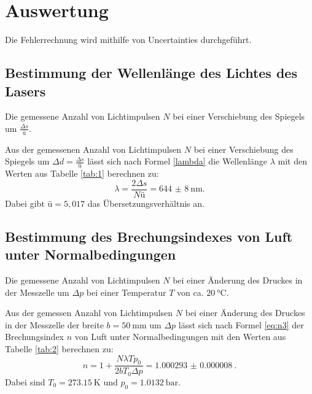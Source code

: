 \section{Auswertung}
\label{sec:Auswertung}

Die Fehlerrechnung wird mithilfe von Uncertainties \cite{uncertainties} durchgeführt.

\subsection{Bestimmung der Wellenlänge des Lichtes des Lasers}
\begin{table}
	\centering
	\caption{Die gemessene Anzahl von Lichtimpulsen $N$ bei einer Verschiebung des Spiegels um $\frac{\Delta s}{ü}$.}
	
	\label{tab:1}
\end{table}
\noindent Aus der gemessenen Anzahl von Lichtimpulsen $N$ bei einer Verschiebung des Spiegels um $\Delta d=\frac{\Delta s}{ü}$ lässt sich nach Formel \eqref{lambda} die Wellenlänge $\lambda$ mit den Werten aus Tabelle \ref{tab:1} berechnen zu:
\[
	\lambda = \frac{2\Delta s}{N ü}=\SI{644(8)}{\nano\meter}\text{.}
\]
Dabei gibt $ü=5,017$ das Übersetzungsverhältnis an.

\subsection{Bestimmung des Brechungsindexes von Luft unter Normalbedingungen}
\begin{table}
	\centering
	\caption{Die gemessene Anzahl von Lichtimpulsen $N$ bei einer Änderung des Druckes in der Messzelle um $\Delta p$ bei einer Temperatur $T$ von ca. $\SI{20}{\degreeCelsius}$.}
	
	\label{tab:2}
\end{table}
\noindent Aus der gemessen Anzahl von Lichtimpulsen $N$ bei einer Änderung des Druckes in der Messzelle der breite $b=\SI{50}{\milli\meter}$ um $\Delta p$ lässt sich nach Formel \eqref{eq:n3} der Brechungsindex $n$ von Luft unter Normalbedingungen mit den Werten aus Tabelle \ref{tab:2} berechnen zu:
\[
	n = 1+ \frac{N \lambda T p_0}{2 b T_0 \Delta p} = \SI{1.000293(8)}{}\text{.}
\]
Dabei sind $T_0=\SI{273,15}{\kelvin}$ und $p_0=\SI{1,0132}{\bar}$. 